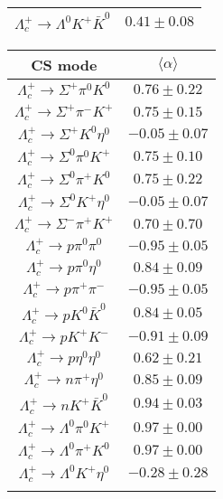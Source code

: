 \begin{table}
{\begin{tabular}{|c|c|}
			$\Lambda_{c}^{+} \to \Lambda^{0} K^{+} \bar{K}^{0} $ & $       0.41 \pm       0.08 $ \\
			\hline
		\end{tabular}
		\begin{tabular}{|c|c|}
			\hline
			CS mode& $\langle \alpha \rangle$\\
			\hline
			$\Lambda_{c}^{+} \to \Sigma^{+} \pi^{0} K^{0} $ & $       0.76 \pm       0.22 $ \\
			$\Lambda_{c}^{+} \to \Sigma^{+} \pi^{-} K^{+} $ & $       0.75 \pm       0.15 $ \\
			$\Lambda_{c}^{+} \to \Sigma^{+} K^{0} \eta^{0} $ & $      -0.05 \pm       0.07 $ \\
			$\Lambda_{c}^{+} \to \Sigma^{0} \pi^{0} K^{+} $ & $       0.75 \pm       0.10 $ \\
			$\Lambda_{c}^{+} \to \Sigma^{0} \pi^{+} K^{0} $ & $       0.75 \pm       0.22 $ \\
			$\Lambda_{c}^{+} \to \Sigma^{0} K^{+} \eta^{0} $ & $      -0.05 \pm       0.07 $ \\
			$\Lambda_{c}^{+} \to \Sigma^{-} \pi^{+} K^{+} $ & $       0.70 \pm       0.70 $ \\
			$\Lambda_{c}^{+} \to p \pi^{0} \pi^{0} $ & $      -0.95 \pm       0.05 $ \\
			$\Lambda_{c}^{+} \to p \pi^{0} \eta^{0} $ & $       0.84 \pm       0.09 $ \\
			$\Lambda_{c}^{+} \to p \pi^{+} \pi^{-} $ & $      -0.95 \pm       0.05 $ \\
			$\Lambda_{c}^{+} \to p K^{0} \bar{K}^{0} $ & $       0.84 \pm       0.05 $ \\
			$\Lambda_{c}^{+} \to p K^{+} K^{-} $ & $      -0.91 \pm       0.09 $ \\
			$\Lambda_{c}^{+} \to p \eta^{0} \eta^{0} $ & $       0.62 \pm       0.21 $ \\
			$\Lambda_{c}^{+} \to n \pi^{+} \eta^{0} $ & $       0.85 \pm       0.09 $ \\
			$\Lambda_{c}^{+} \to n K^{+} \bar{K}^{0} $ & $       0.94 \pm       0.03 $ \\
			$\Lambda_{c}^{+} \to \Lambda^{0} \pi^{0} K^{+} $ & $       0.97 \pm       0.00 $ \\
			$\Lambda_{c}^{+} \to \Lambda^{0} \pi^{+} K^{0} $ & $       0.97 \pm       0.00 $ \\
			$\Lambda_{c}^{+} \to \Lambda^{0} K^{+} \eta^{0} $ & $      -0.28 \pm       0.28 $ \\
			&\\

\end{tabular}}
\end{table}
